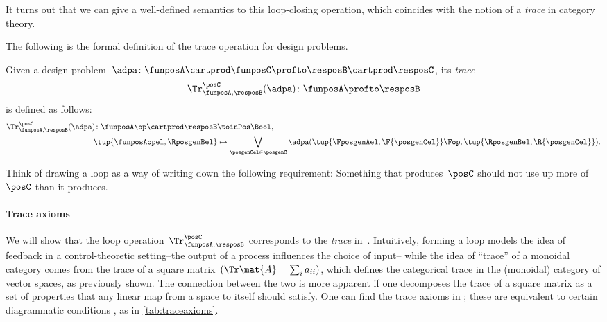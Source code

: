 It turns out that we can give a well-defined semantics to this loop-closing operation, which coincides with the notion of a \emph{trace} in category theory.

The following is the formal definition of the trace operation for design problems.

\begin{definition}
	\label{def:dp-trace}
	Given a design problem~$\adpa\colon \funposA \cartprod \funposC \profto \resposB \cartprod \resposC$, its \emph{trace}
	\begin{equation}
		\Tr_{\funposA,\resposB}^\posC(\adpa) \colon \funposA \profto \resposB
	\end{equation}
	is defined as follows:
	\begin{equation}
		\label{eq:tracedef}
		\begin{aligned}
			\Tr_{\funposA,\resposB}^\posC(\adpa) \colon  \funposA\op \cartprod \resposB & \toinPos \Bool,                           \\
			\tup{\funposAopel, \RposgenBel}                                             & \mapsto \bigvee_{\posgenCel \in \posgenC}
			\adpa(\tup{\FposgenAel, \F{\posgenCel}}\Fop,
			\tup{\RposgenBel, \R{\posgenCel}}).
		\end{aligned}
	\end{equation}
\end{definition}

Think of drawing a loop as a way of writing down the following requirement:
Something that produces~$\posC$ should not use up more of~$\posC$ than it produces.


\paragraph{Trace axioms}
We will show that the loop operation~$\Tr_{\funposA,\resposB}^\posC$ corresponds to the \emph{trace} in~\DP.
Intuitively, forming a loop models the idea of feedback in a control-theoretic setting--the output of a process influences the choice of input--
while the idea of ``trace'' of a monoidal category comes from the trace of a square matrix~$(\Tr\mat{A} = \sum_i a_{ii})$, which defines the categorical trace in the (monoidal) category of vector spaces, as previously shown.
The connection between the two is more apparent if one decomposes the trace of a square matrix as a set of properties that any linear map from a space to itself should satisfy.
One can find the trace axioms in  \cite{mac2013categories};
these are equivalent to certain diagrammatic conditions \cite{joyal96}, as in \cref{tab:traceaxioms}.

